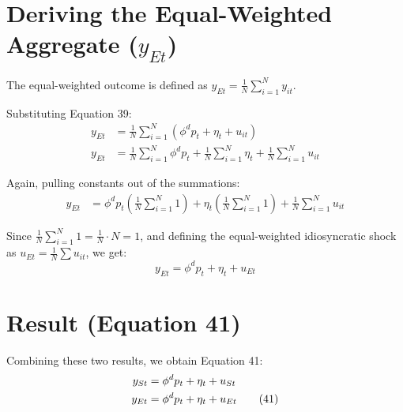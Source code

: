 \documentclass[11pt]{article}
\begin{document}
\section{Deriving the Equal-Weighted Aggregate ($y_{Et}$)}
The equal-weighted outcome is defined as $y_{Et} = \frac{1}{N} \sum_{i=1}^N y_{it}$.

Substituting Equation 39:
\begin{align*}
y_{Et} &= \frac{1}{N} \sum_{i=1}^N (\phi^d p_t + \eta_t + u_{it}) \\
y_{Et} &= \frac{1}{N} \sum_{i=1}^N \phi^d p_t + \frac{1}{N} \sum_{i=1}^N \eta_t + \frac{1}{N} \sum_{i=1}^N u_{it}
\end{align*}

Again, pulling constants out of the summations:
\begin{align*}
y_{Et} &= \phi^d p_t \left( \frac{1}{N} \sum_{i=1}^N 1 \right) + \eta_t \left( \frac{1}{N} \sum_{i=1}^N 1 \right) + \frac{1}{N} \sum_{i=1}^N u_{it}
\end{align*}

Since $\frac{1}{N} \sum_{i=1}^N 1 = \frac{1}{N} \cdot N = 1$, and defining the equal-weighted idiosyncratic shock as $u_{Et} = \frac{1}{N} \sum u_{it}$, we get:
\begin{equation}
y_{Et} = \phi^d p_t + \eta_t + u_{Et}
\end{equation}

\section{Result (Equation 41)}
Combining these two results, we obtain Equation 41:
\begin{align}
y_{St} &= \phi^d p_t + \eta_t + u_{St} \notag \\
y_{Et} &= \phi^d p_t + \eta_t + u_{Et} \tag{41}
\end{align}
\end{document}
